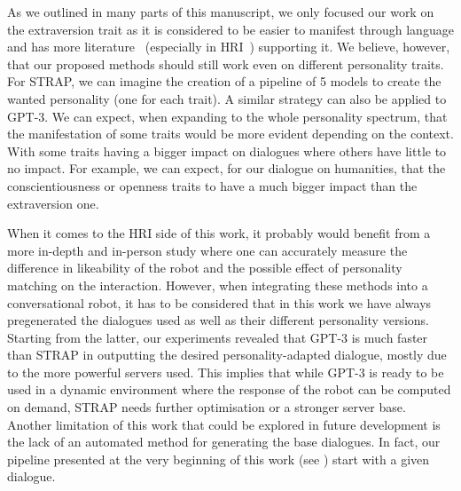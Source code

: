 \documentclass[nomenclature, english, biblatex]{kththesis}
\begin{document}
As we outlined in many parts of this manuscript, we only focused our work on the extraversion trait as it is considered to be easier to manifest through language and has more literature~\cite{pennebaker1999linguistic, furnham1990language, thorne1987press, heylighen2002variation, dewaele1999extraversion} (especially in \gls{HRI}~\cite{aly2013model, andriella2020have, moshkina2011tame}) supporting it. We believe, however, that our proposed methods should still work even on different personality traits. For STRAP, we can imagine the creation of a pipeline of 5 models to create the wanted personality (one for each trait). A similar strategy can also be applied to GPT-3. We can expect, when expanding to the whole personality spectrum, that the manifestation of some traits would be more evident depending on the context. With some traits having a bigger impact on dialogues where others have little to no impact. For example, we can expect, for our dialogue on humanities, that the conscientiousness or openness traits to have a much bigger impact than the extraversion one.

When it comes to the \gls{HRI} side of this work, it probably would benefit from a more in-depth and in-person study where one can accurately measure the difference in likeability of the robot and the possible effect of personality matching on the interaction. However, when integrating these methods into a conversational robot, it has to be considered that in this work we have always pregenerated the dialogues used as well as their different personality versions. Starting from the latter, our experiments revealed that GPT-3 is much faster than STRAP in outputting the desired personality-adapted dialogue, mostly due to the more powerful servers used. This implies that while GPT-3 is ready to be used in a dynamic environment where the response of the robot can be computed on demand, STRAP needs further optimisation or a stronger server base. Another limitation of this work that could be explored in future development is the lack of an automated method for generating the base dialogues. In fact, our pipeline presented at the very beginning of this work (see ) start with a given dialogue.

\cleardoublepage
\renewcommand{\bibname}{References}
\printbibliography[heading=bibintoc]

\cleardoublepage
\appendix
\end{document}
